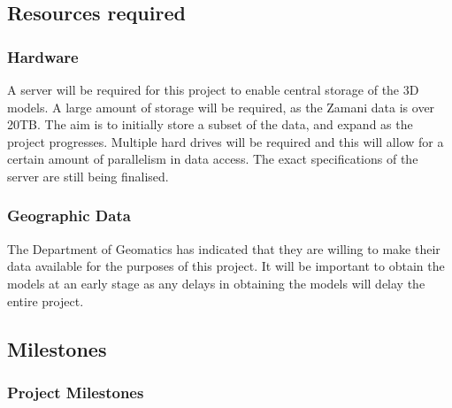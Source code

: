 \documentclass[12pt,a4paper]{article}
\begin{document}
\subsection{Resources required}
\subsubsection*{Hardware}
A server will be required for this project to enable central storage of the 3D models.
A large amount of storage will be required, as the Zamani data is over 20TB. The aim
is to initially store a subset of the data, and expand as the project progresses.
Multiple hard drives will be required and this will allow for a certain amount of
parallelism in data access. The exact specifications of the server are still
being finalised.
\subsubsection*{Geographic Data}
The Department of Geomatics has indicated that they are willing to make their data
available for the purposes of this project. It will be important to obtain the
models at an early stage as any delays in obtaining the models will delay the entire project.

\subsection{Milestones}
\subsubsection{Project Milestones}
\end{document}
